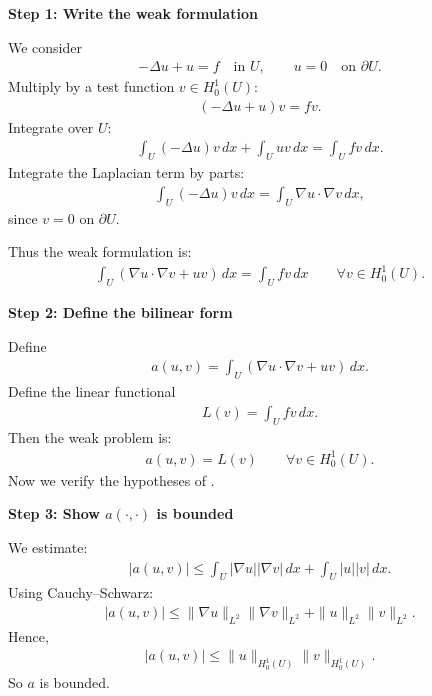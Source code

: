 \documentclass[12pt,a4paper]{report}
\begin{document}
\begin{description}
\begin{description}

\item \textbf{Step 1: Write the weak formulation}

We consider
\begin{align*}
-\Delta u+u=f \quad\text{in }U, \qquad u=0 \quad\text{on }\partial U.
\end{align*}
Multiply by a test function $v\in H_0^1(U)$:
\begin{align*}
(-\Delta u+u)v=fv.
\end{align*}
Integrate over $U$:
\begin{align*}
\int_U(-\Delta u)v\,dx+\int_U uv\,dx=\int_U fv\,dx.
\end{align*}
Integrate the Laplacian term by parts:
\begin{align*}
\int_U(-\Delta u)v\,dx=\int_U \nabla u\cdot\nabla v\,dx,
\end{align*}
since $v=0$ on $\partial U$.

Thus the weak formulation is:
\begin{align*}
\boxed{
\int_U (\nabla u\cdot\nabla v+uv)\,dx = \int_U fv\,dx \qquad\forall v\in H_0^1(U).
}
\end{align*}

\item \textbf{Step 2: Define the bilinear form}

Define
\begin{align*}
a(u,v)=\int_U(\nabla u\cdot\nabla v+uv)\,dx.
\end{align*}
Define the linear functional
\begin{align*}
L(v)=\int_U fv\,dx.
\end{align*}
Then the weak problem is:
\begin{align*}
a(u,v)=L(v)
\qquad\forall v\in H_0^1(U).
\end{align*}
Now we verify the hypotheses of .

\item \textbf{Step 3: Show $a(\cdot,\cdot)$ is bounded}

We estimate:
\begin{align*}
|a(u,v)| \le \int_U |\nabla u||\nabla v|\,dx+\int_U |u||v|\,dx.
\end{align*}
Using Cauchy–Schwarz:
\begin{align*}
|a(u,v)| \le \|\nabla u\|_{L^2}\|\nabla v\|_{L^2} + \|u\|_{L^2}\|v\|_{L^2}.
\end{align*}
Hence,
\begin{align*}
|a(u,v)| \le \|u\|_{H_0^1(U)}\|v\|_{H_0^1(U)}.
\end{align*}
So $a$ is bounded.


\end{description}
\end{description}
\end{document}
